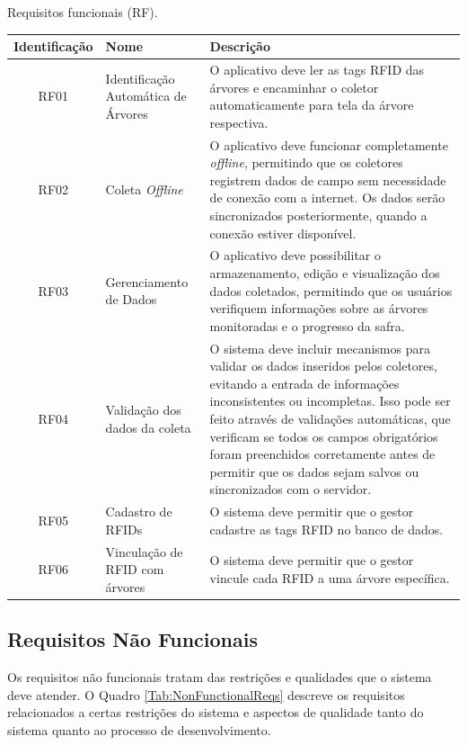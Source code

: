 \begin{quadro}[!htb]
    \centering
    \footnotesize
    \caption{Requisitos funcionais (RF).}
    \begin{tabular}{|c|p{4cm}|p{8cm}|}
        \hline
        \textbf{Identificação} & \centering\textbf{Nome} & \textbf{Descrição} \\
        \hline
        RF01          & Identificação Automática de Árvores         & O aplicativo deve ler as tags RFID das árvores e encaminhar o coletor automaticamente para tela da árvore respectiva.\\ \hline
        
        RF02          & Coleta \textit{Offline}          & O aplicativo deve funcionar completamente \textit{offline}, permitindo que os coletores registrem dados de campo sem necessidade de conexão com a internet. Os dados serão sincronizados posteriormente, quando a conexão estiver disponível. \\ \hline
        
        RF03          & Gerenciamento de Dados       &  O aplicativo deve possibilitar o armazenamento, edição e visualização dos dados coletados, permitindo que os usuários verifiquem informações sobre as árvores monitoradas e o progresso da safra.\\ \hline
        
        RF04          & Validação dos dados da coleta & O sistema deve incluir mecanismos para validar os dados inseridos pelos coletores, evitando a entrada de informações inconsistentes ou incompletas. Isso pode ser feito através de validações automáticas, que verificam se todos os campos obrigatórios foram preenchidos corretamente antes de permitir que os dados sejam salvos ou sincronizados com o servidor.\\ \hline
        
        RF05          & Cadastro de RFIDs & O sistema deve permitir que o gestor cadastre as tags RFID no banco de dados.\\ \hline
        
        RF06          & Vinculação de RFID com árvores & O sistema deve permitir que o gestor vincule cada RFID a uma árvore específica.\\ \hline

    \end{tabular}
    \label{Tab:FunctionalReqs}
\end{quadro}
\newpage

\subsection{Requisitos Não Funcionais}
Os requisitos não funcionais tratam das restrições e qualidades que o sistema deve atender. O Quadro \ref{Tab:NonFunctionalReqs} descreve os requisitos relacionados a certas restrições do sistema e aspectos de qualidade tanto do sistema quanto ao processo de desenvolvimento. 

